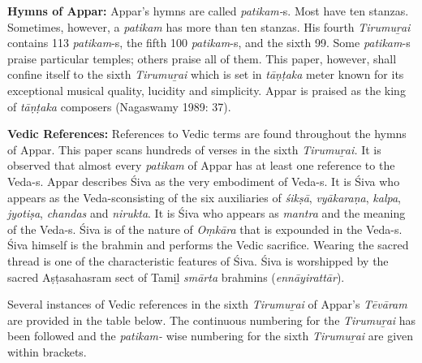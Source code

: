 \textbf{Hymns of Appar:} Appar’s hymns are called \textit{patikam-}s. Most have ten stanzas. Sometimes, however, a \textit{patikam} has more than ten stanzas. His fourth \textit{Tirumuṟai }contains 113 \textit{patikam}-s, the fifth 100 \textit{patikam}-s, and the sixth 99. Some \textit{patikam}-s praise particular temples; others praise all of them. This paper, however, shall confine itself to the sixth \textit{Tirumuṟai} which is set in \textit{tāṇṭaka} meter known for its exceptional musical quality, lucidity and simplicity. Appar is praised as the king of \textit{tāṇṭaka }composers (Nagaswamy 1989: 37).

\textbf{Vedic References:} References to Vedic terms are found throughout the hymns of Appar. This paper scans hundreds of verses in the sixth \textit{Tirumuṟai. }It is observed that almost every \textit{patikam} of Appar has at least one reference to the Veda-s. Appar describes Śiva as the very embodiment of Veda-s. It is Śiva who appears as the Veda-s\break consisting of the six auxiliaries of \textit{śikṣā}, \textit{vyākaraṇa}, \textit{kalpa}, \textit{jyotiṣa}, \textit{chandas} and \textit{nirukta}. It is Śiva who appears as \textit{mantra} and the meaning of the Veda-s. Śiva is of the nature of \textit{Oṃkāra }that is expounded in the Veda-s. Śiva himself is the brahmin and performs the Vedic sacrifice. Wearing the sacred thread is one of the characteristic features of Śiva. Śiva is worshipped by the sacred Aṣṭasahasram sect of Tamiḻ \textit{smārta} brahmins (\textit{ennāyirattār}).

Several instances of Vedic references in the sixth \textit{Tirumuṟai} of Appar’s \textit{Tēvāram} are provided in the table below. The continuous numbering for the \textit{Tirumuṟai }has been followed and the \textit{patikam-} wise numbering for the sixth \textit{Tirumuṟai }are given within brackets.

